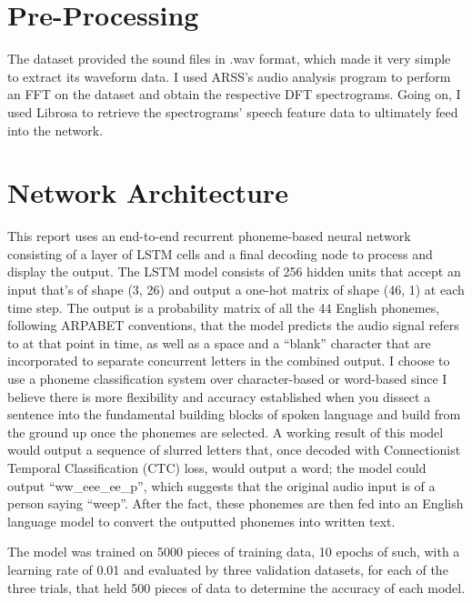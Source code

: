\section{Pre-Processing}

The dataset provided the sound files in .wav format, which made it very simple to extract its waveform data. I used ARSS’s audio analysis program to perform an FFT on the dataset and obtain the respective DFT spectrograms. Going on, I used Librosa to retrieve the spectrograms' speech feature data to ultimately feed into the network.

\section{Network Architecture}

This report uses an end-to-end recurrent phoneme-based neural network consisting of a layer of LSTM cells and a final decoding node to process and display the output. The LSTM model consists of 256 hidden units that accept an input that’s of shape (3, 26) and output a one-hot matrix of shape (46, 1) at each time step. The output is a probability matrix of all the 44 English phonemes, following ARPABET conventions, that the model predicts the audio signal refers to at that point in time, as well as a space and a “blank” character that are incorporated to separate concurrent letters in the combined output. I choose to use a phoneme classification system over character-based or word-based since I believe there is more flexibility and accuracy established when you dissect a sentence into the fundamental building blocks of spoken language and build from the ground up once the phonemes are selected. A working result of this model would output a sequence of slurred letters that, once decoded with Connectionist Temporal Classification (CTC) loss, would output a word; the model could output “ww_eee_ee_p”, which suggests that the original audio input is of a person saying “weep”. After the fact, these phonemes are then fed into an English language model to convert the outputted phonemes into written text.
\newline\par
The model was trained on 5000 pieces of training data, 10 epochs of such, with a learning rate of 0.01 and evaluated by three validation datasets, for each of the three trials, that held 500 pieces of data to determine the accuracy of each model.

